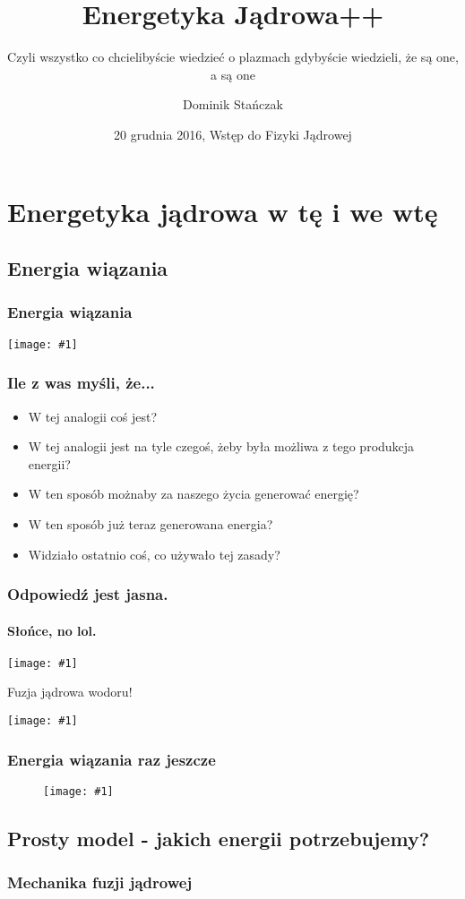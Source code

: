 \documentclass{beamer}
\title[Fizyka plazmy]{Energetyka Jądrowa++}
\subtitle{Czyli wszystko co chcielibyście wiedzieć o plazmach gdybyście
wiedzieli, że są one, a są one}
\institute{Politechnika Warszawska}
\author{Dominik Stańczak}
\date{20 grudnia 2016, Wstęp do Fizyki Jądrowej}
\newcommand {\framedgraphic}[1] {
        \begin{center}
            \texttt{[image: \#1]}
        \end{center}
}
\begin{document}
  \frame{\titlepage}

  \section{Energetyka jądrowa w tę i we wtę}
  \subsection{Energia wiązania}

  \begin{frame}
    \frametitle{Energia wiązania}
    \framedgraphic{img/binding_energy.png}
  \end{frame}


  \begin{frame}
    \frametitle{Ile z was myśli, że...}
    \begin{itemize}[<+->]
      \item W tej analogii coś jest?
      \item W tej analogii jest na tyle czegoś, żeby była możliwa z tego produkcja energii?
      \item W ten sposób możnaby za naszego życia generować energię?
      \item W ten sposób już teraz generowana energia?
      \item Widziało ostatnio coś, co używało tej zasady?
    \end{itemize}
   \end{frame}


  \begin{frame}
    \frametitle{Odpowiedź jest jasna.}
    \framesubtitle{Słońce, no lol.}
    \framedgraphic{img/large_sun}
  \end{frame}
  \begin{frame}[t]{Fuzja jądrowa wodoru!}
    \framedgraphic{img/hh_fusion}
  \end{frame}


  \begin{frame}
    \frametitle{Energia wiązania raz jeszcze}
    \begin{figure}
      \framedgraphic{img/binding_energy}
    \end{figure}
  \end{frame}

  \subsection{Prosty model - jakich energii potrzebujemy?}
  \begin{frame}
    \frametitle{Mechanika fuzji jądrowej}
  \end{frame}
\end{document}
